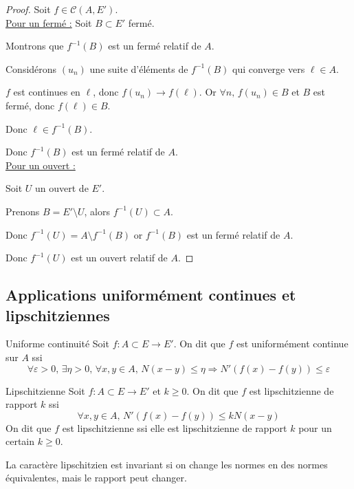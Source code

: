 \begin{proof}
    Soit $f \in \mathscr C(A, E')$. \\

    \uline{Pour un fermé :}
    Soit $B \subset E'$ fermé. 

    Montrons que $f^{-1}(B)$ est un fermé relatif de $A$.

    Considérons $(u_n)$ une suite d'éléments de $f^{-1}(B)$ qui converge vers $\ell \in A$.

    $f$ est continues en $\ell$, donc $f(u_n) \rightarrow f(\ell)$. 
    Or $\forall n, \, f(u_n) \in B$ et $B$ est fermé, donc $f(\ell) \in B$.

    Donc $\ell \in f^{-1}(B)$. 

    Donc $f^{-1}(B)$ est un fermé relatif de $A$. \\

    \uline{Pour un ouvert :}

    \svspace Soit $U$ un ouvert de $E'$.

    Prenons $B = E' \setminus U$, alors $f^{-1}(U) \subset A$. 

    Donc $f^{-1}(U) = A \setminus f^{-1}(B)$ or $f^{-1}(B)$ est un fermé relatif de $A$.

    Donc $f^{-1}(U)$ est un ouvert relatif de $A$.
\end{proof}

\subsection{Applications uniformément continues et lipschitziennes}

\begin{definition}{Uniforme continuité}{}
    Soit $f : A \subset E \to E'$. On dit que $f$ est uniformément continue sur $A$ ssi 
    \[\forall \varepsilon > 0, \, \exists \eta > 0, \, \forall x, y \in A, \, N(x - y) \leqslant \eta \Rightarrow N'(f(x) - f(y)) \leqslant \varepsilon\]
\end{definition}

\begin{definition}{Lipschitzienne}{}
    Soit $f : A \subset E \to E'$ et $k \geqslant 0$. On dit que $f$ est lipschitzienne 
    de rapport $k$ ssi 
    \[\forall x, y \in A, \, N'(f(x) - f(y)) \leqslant k N(x - y)\]
    On dit que $f$ est lipschitzienne ssi elle est lipschitzienne de rapport $k$ pour un certain $k \geqslant 0$.
\end{definition}

\begin{remarque}
    La caractère lipschitzien est invariant si on change les normes en des normes 
    équivalentes, mais le rapport peut changer.
\end{remarque}

